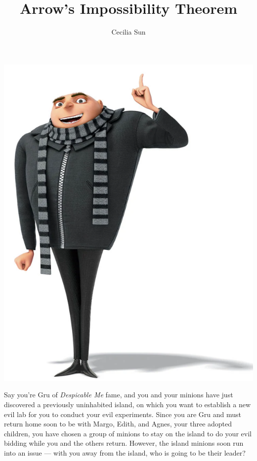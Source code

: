 \documentclass{article}
\title{Arrow’s Impossibility Theorem}
\author{Cecilia Sun}
\begin{document}
\maketitle
\begin{center}
    \includegraphics[scale=0.35]{images/gru.png}
\end{center}

Say you’re Gru of \textit{Despicable Me} fame, and you and your minions have just discovered a previously uninhabited island, on which you want to establish a new evil lab for you to conduct your evil experiments. Since you are Gru and must return home soon to be with Margo, Edith, and Agnes, your three adopted children, you have chosen a group of minions to stay on the island to do your evil bidding while you and the others return. However, the island minions soon run into an issue --- with you away from the island, who is going to be their leader? 
\end{document}
